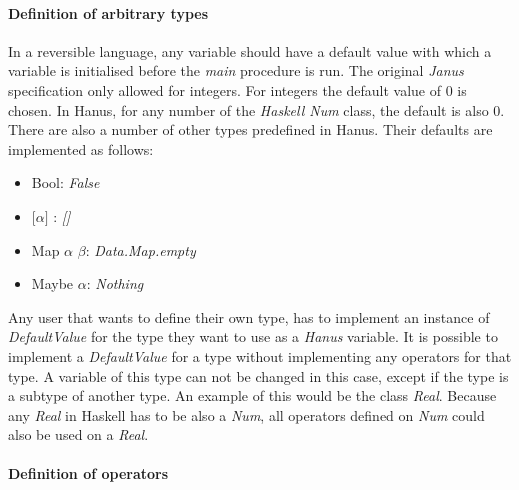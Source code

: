 \documentclass[12pt,a4paper]{article}
\begin{document}
	\paragraph{Definition of arbitrary types}
	In a reversible language, any variable should have a default value with which a variable is initialised before the \textit{main} procedure is run. The original \textit{Janus} specification only allowed for integers. For integers the default value of 0 is chosen. In Hanus, for any number of the \textit{Haskell Num} class, the default is also 0. There are also a number of other types predefined in Hanus. Their defaults are implemented as follows:
	\begin{itemize}
		\item Bool: \textit{False}
		\item $\lbrack\alpha\rbrack$ : \textit{[]}
		\item Map $\alpha$ $\beta$: \textit{Data.Map.empty}
		\item Maybe $\alpha$: \textit{Nothing}
	\end{itemize}
	Any user that wants to define their own type, has to implement an instance of \textit{DefaultValue} for the type they want to use as a \textit{Hanus} variable. It is possible to implement a \textit{DefaultValue} for a type without implementing any operators for that type. A variable of this type can not be changed in this case, except if the type is a subtype of another type. An example of this would be the class \textit{Real}. Because any \textit{Real} in Haskell has to be also a \textit{Num}, all operators defined on \textit{Num} could also be used on a \textit{Real}.
	
	\paragraph{Definition of operators}
\end{document}

